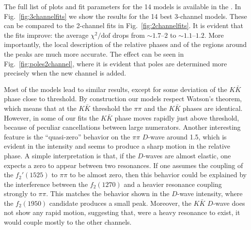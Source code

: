 The full list of plots and fit parameters for the 14 models is available in the . 
In Fig.~\ref{fig:3channelfits} we show the results for the 14 best  3-channel models. These can be compared to the 2-channel fits in Fig.~\ref{fig:2channelfits}. It is evident that the fits improve: the average $\chi^2/\text{dof}$ drops from $\sim 1.7$--$2$ to $\sim 1.1$--$1.2$. 
More importantly, the local description of the relative phases and of the regions around the peaks are much more accurate. The effect can be seen in Fig.~\ref{fig:poles2channel},  where it is evident that poles are determined more precisely when the new channel is added. 


Most of the models lead to similar results, except for some deviation of the $K \bar K$ phase close to threshold. By construction our models respect Watson's theorem, which means that at the $K \bar K$ threshold  the $\pi \pi$ and the $K \bar K$ phases are identical. However, in some of our fits the $K \bar K$ phase moves rapidly just above threshold, because of peculiar cancellations between large numerators. Another interesting feature is the ``quasi-zero'' behavior on the $\pi \pi$ $D$-wave around 1.5\gev, which is evident in the intensity and seems to produce a sharp motion in the relative phase. A simple interpretation is that, if the $D$-waves are almost elastic, one expects a zero to appear between two resonances. If one assumes the coupling of the $f_2'(1525)$ to $\pi \pi$ to be almost zero, then this behavior could be explained by the interference between the $f_2(1270)$ and a heavier resonance coupling strongly to $\pi \pi$. This matches the behavior shown in the $D$-wave intensity, where the $f_2(1950)$ candidate produces a small peak. Moreover, the $K \bar K$ $D$-wave does not show any rapid motion, suggesting that, were a heavy resonance to exist, it would couple mostly to the other channels.

